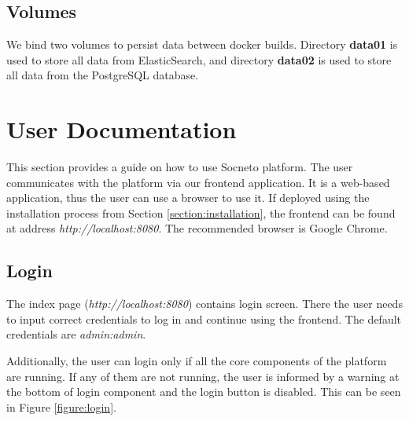 \documentclass{article}
\begin{document}
\subsection{Volumes}
We bind two volumes to persist data between docker builds. Directory \textbf{data01} is used to store all data from ElasticSearch, and directory \textbf{data02} is used to store all data from the PostgreSQL database.



























\section{User Documentation}

This section provides a guide on how to use Socneto platform. The user communicates with the platform via our frontend application. It is a web-based application, thus the user can use a browser to use it. If deployed using the installation process from Section \ref{section:installation}, the frontend can be found at address \textit{http://localhost:8080}. The recommended browser is Google Chrome.

\subsection{Login}
\label{section:login}

The index page (\textit{http://localhost:8080}) contains login screen. There the user needs to input correct credentials to log in and continue using the frontend. The default credentials are \textit{admin:admin}.

Additionally, the user can login only if all the core components of the platform are running. If any of them are not running, the user is informed by a warning at the bottom of login component and the login button is disabled. This can be seen in Figure \ref{figure:login}.
\end{document}
